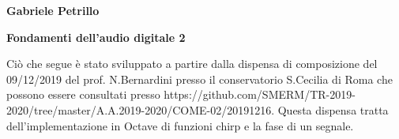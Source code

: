 \documentclass[11pt]{article}
\begin{document}
\begin{minipage}{0.55\linewidth}
\vspace{0.3cm}
{\large{\textbf{\textsf{Gabriele Petrillo}}}}\\\end{minipage}

\vspace{0.3cm}
\begin{minipage}{0.95\linewidth}
\begin{center}
{\huge{\textbf{\textsf{Fondamenti dell'audio digitale 2}}}} \\
\end{center}
\end{minipage}
\vspace*{0.2cm}


\begin{center}
\begin{minipage}[c]{14cm}
\begin{textit}

Ciò che segue è stato sviluppato a partire dalla dispensa di composizione del 09/12/2019 del prof. N.Bernardini presso il conservatorio S.Cecilia di Roma che possono essere consultati presso https://github.com/SMERM/TR-2019-2020/tree/master/A.A.2019-2020/COME-02/20191216. Questa dispensa tratta dell'implementazione in Octave di funzioni chirp e la fase di un segnale.

\end{textit}
\end{minipage}
\end{center}
\vspace*{0.2cm}

\end{document}
